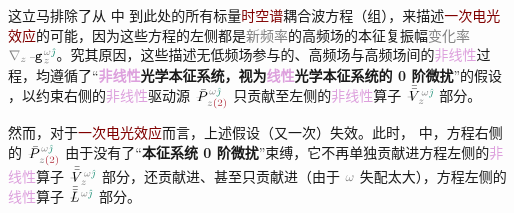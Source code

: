 这立马排除了从  中  到此处的所有标量\textcolor{Maroon}{时空谱}耦合波方程（组），来描述\textcolor{Maroon}{一次电光效应}的可能，因为这些方程的左侧都是\textcolor{gray}{新频率}的\textcolor{NavyBlue}{高频场}的\textcolor{PineGreen}{本征复振幅}\textcolor{gray}{变化率} $\mathcolor{gray}{\nabla_z} \xint{\begin{smallmatrix} ~ \\ {}^{}_{\mathcolor{gray}{-}} \\ ~ \end{smallmatrix}}{09}{\mathtt{g}}^{\;\!\mathcolor{gray}{\omega} \textcolor{PineGreen}{\hat{\jmath}}}_{\;\! \mathcolor{gray}{z}}$。究其原因，这些描述无\textcolor{NavyBlue}{低频场}参与的、\textcolor{NavyBlue}{高频场}与\textcolor{NavyBlue}{高频场}间的\textcolor{Plum}{非线性}过程，均遵循了“\textbf{\textcolor{Plum}{非线性}\textcolor{NavyBlue}{光学}\textcolor{PineGreen}{本征系统}，视为\textcolor{Plum}{线性}\textcolor{NavyBlue}{光学}\textcolor{PineGreen}{本征系统}的 \textcolor{NavyBlue}{0 阶微扰}}”的假设 ，以约束右侧的\textcolor{Plum}{非线性}\textcolor{NavyBlue}{驱动源} $\xint{\mathcolor{gray}{-}}{25}{\bar{P}}^{\;\! \mathcolor{gray}{\omega} \textcolor{PineGreen}{\hat{\jmath}}}_{\;\! \mathcolor{gray}{z} \textcolor{Maroon}{(2)}}$ 只贡献至左侧的\textcolor{Plum}{非线性}算子 $\xint{\mathcolor{gray}{-}}{21}{\bar{\bar{V}}}^{\;\! \mathcolor{gray}{\omega} \textcolor{PineGreen}{\hat{\jmath}}}_{\;\! \mathcolor{gray}{z}}$ 部分。

然而，对于\textcolor{Maroon}{一次电光效应}而言，上述假设（又一次）失效。此时， 中，方程右侧的 $\xint{\mathcolor{gray}{-}}{25}{\bar{P}}^{\;\! \mathcolor{gray}{\omega} \textcolor{PineGreen}{\hat{\jmath}}}_{\;\! \mathcolor{gray}{z} \textcolor{Maroon}{(2)}}$ 由于没有了“\textbf{\textcolor{PineGreen}{本征系统} \textcolor{NavyBlue}{0 阶微扰}}”束缚，它不再单独贡献进方程左侧的\textcolor{Plum}{非线性}算子 $\xint{\mathcolor{gray}{-}}{21}{\bar{\bar{V}}}^{\;\! \mathcolor{gray}{\omega} \textcolor{PineGreen}{\hat{\jmath}}}_{\;\! \mathcolor{gray}{z}}$ 部分，还贡献进、甚至只贡献进（由于 $\textcolor{gray}{\omega}$ 失配太大），方程左侧的\textcolor{Plum}{线性}算子 $\xint{\mathcolor{gray}{-}}{30}{\bar{\bar{L}}}^{\;\! \mathcolor{gray}{\omega} \textcolor{PineGreen}{\hat{\jmath}}}$ 部分。

